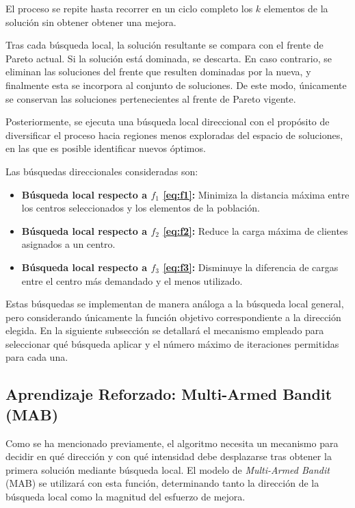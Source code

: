 \documentclass[12pt,a4paper]{book}
\begin{document}
El proceso se repite hasta recorrer en un ciclo completo los $k$ elementos de la solución sin obtener obtener una mejora.

Tras cada búsqueda local, la solución resultante se compara con el frente de Pareto actual. Si la solución está dominada, se descarta. En caso contrario, se eliminan las soluciones del frente que resulten dominadas por la nueva, y finalmente esta se incorpora al conjunto de soluciones. De este modo, únicamente se conservan las soluciones pertenecientes al frente de Pareto vigente.

Posteriormente, se ejecuta una búsqueda local direccional con el propósito de diversificar el proceso hacia regiones menos exploradas del espacio de soluciones, en las que es posible identificar nuevos óptimos.  

Las búsquedas direccionales consideradas son:  

\begin{itemize}
    \item \textbf{Búsqueda local respecto a $f_1$ \ref{eq:f1}:} Minimiza la distancia máxima entre los centros seleccionados y los elementos de la población.
    \item \textbf{Búsqueda local respecto a $f_2$ \ref{eq:f2}:} Reduce la carga máxima de clientes asignados a un centro.
    \item \textbf{Búsqueda local respecto a $f_3$ \ref{eq:f3}:} Disminuye la diferencia de cargas entre el centro más demandado y el menos utilizado.
\end{itemize}

Estas búsquedas se implementan de manera análoga a la búsqueda local general, pero considerando únicamente la función objetivo correspondiente a la dirección elegida. En la siguiente subsección se detallará el mecanismo empleado para seleccionar qué búsqueda aplicar y el número máximo de iteraciones permitidas para cada una.

\subsection{Aprendizaje Reforzado: Multi-Armed Bandit (MAB)}
Como se ha mencionado previamente, el algoritmo necesita un mecanismo para decidir en qué dirección y con qué intensidad debe desplazarse tras obtener la primera solución mediante búsqueda local. El modelo de \textit{Multi-Armed Bandit} (MAB) se utilizará con esta función, determinando tanto la dirección de la búsqueda local como la magnitud del esfuerzo de mejora.
\end{document}
